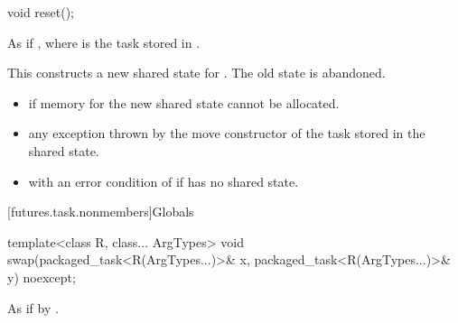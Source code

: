 %
\begin{itemdecl}
void reset();
\end{itemdecl}

\begin{itemdescr}
\pnum
\effects
As if , where
 is the task stored in
.
\begin{note}
This constructs a new shared state for . The
old state is abandoned.
\end{note}

\pnum
\throws
\begin{itemize}
\item {} if memory for the new shared state cannot be allocated.
\item any exception thrown by the move constructor of the task stored in the shared
state.
\item {} with an error condition of  if 
has no shared state.
\end{itemize}
\end{itemdescr}

[futures.task.nonmembers]{Globals}

%
\begin{itemdecl}
template<class R, class... ArgTypes>
  void swap(packaged_task<R(ArgTypes...)>& x, packaged_task<R(ArgTypes...)>& y) noexcept;
\end{itemdecl}

\begin{itemdescr}
\pnum
\effects
As if by .
\end{itemdescr}

